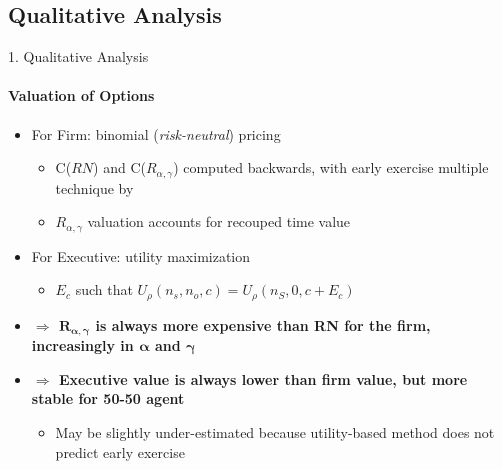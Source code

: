 \documentclass[compress]{beamer}
\begin{document}
\subsection{Qualitative Analysis}
\begin{frame}{1. Qualitative Analysis}
    \framesubtitle{Valuation of Options}

    \begin{itemize}
        \item For Firm: binomial (\textit{risk-neutral}) pricing
        \begin{itemize}
            \item C($RN$) and C($R_{\alpha, \gamma}$) computed backwards, with early exercise multiple technique by \citet{hull2004value}
            \item $R_{\alpha, \gamma}$ valuation accounts for recouped time value
        \end{itemize}
        \item For Executive: utility maximization
        \begin{itemize}
            \item $E_c$ such that $U_\rho(n_s, n_o, c) = U_\rho(n_S, 0, c + E_c)$
        \end{itemize} 
        \vspace*{5pt}
        \item \textbf{ $\Rightarrow$ $\boldsymbol{R_{\alpha, \gamma}}$ is always more expensive than RN for the firm, increasingly in $\boldsymbol{\alpha}$ and $\boldsymbol{\gamma}$ }
        \item \textbf{ $\Rightarrow$ Executive value is always lower than firm value, but more stable for 50-50 agent}
        \begin{itemize}
            \item May be slightly under-estimated because utility-based method does not predict early exercise \citep{grasselli2009risk}
        \end{itemize}
    \end{itemize}
\end{frame}
\end{document}
